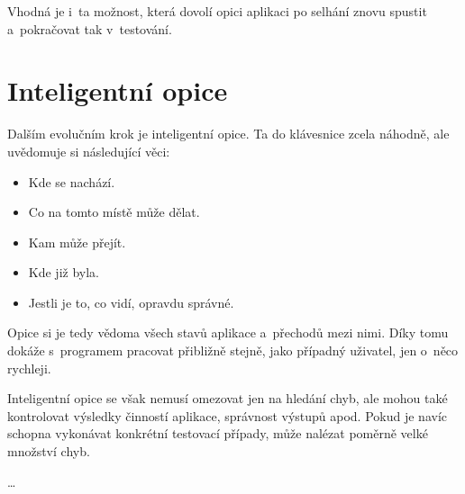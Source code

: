 	Vhodná je i~ta možnost, která dovolí opici aplikaci po selhání znovu spustit a~pokračovat tak v~testování.
	
	\section{Inteligentní opice}
	Dalším evolučním krok je inteligentní opice. Ta do klávesnice  zcela náhodně, ale uvědomuje si následující věci:
		\begin{itemize}
			\item Kde se nachází.
			\item Co na tomto místě může dělat.
			\item Kam může přejít.
			\item Kde již byla.
			\item Jestli je to, co vidí, opravdu správné.
		\end{itemize}
	Opice si je tedy vědoma všech stavů aplikace a~přechodů mezi nimi. Díky tomu dokáže s~programem pracovat přibližně stejně, jako případný uživatel, jen o~něco rychleji.
	
	Inteligentní opice se však nemusí omezovat jen na hledání chyb, ale mohou také kontrolovat výsledky činností aplikace, správnost výstupů apod. Pokud je navíc schopna vykonávat konkrétní testovací případy, může nalézat poměrně velké množství chyb.
	
	\dots